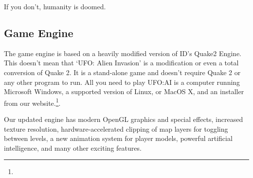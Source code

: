 If you don't, humanity is doomed.

\subsection{Game Engine}
The game engine is based on a heavily modified version of ID's Quake2 Engine. This doesn't mean that `UFO: Alien Invasion' is a modification or even a total conversion of Quake 2. It is a stand-alone game and doesn't require Quake 2 or any other program to run. All you need to play UFO:AI is a computer running Microsoft Windows, a supported version of Linux, or MacOS X, and an installer from our website.\footnote{\ufohomepage}.

Our updated engine has modern OpenGL graphics and special effects, increased texture resolution, hardware-accelerated clipping of map layers for toggling between levels, a new animation system for player models, powerful artificial intelligence, and many other exciting features.
